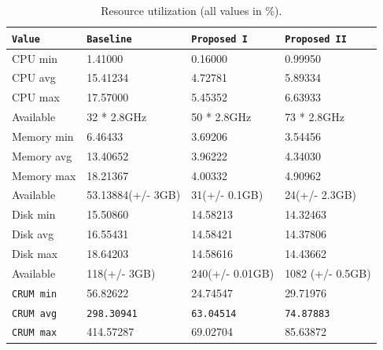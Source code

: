 \documentclass{uvamscse}
\begin{document}
\begin{table}[H]
\begin{center}
\begin{tabular}{llll}
  \texttt{Value}          & \texttt{Baseline}   & \texttt{Proposed I}  & \texttt{Proposed II} \\
  \hline
  CPU min                 & 1.41000             & 0.16000              & 0.99950              \\
  CPU avg                 & 15.41234            & 4.72781              & 5.89334              \\
  CPU max                 & 17.57000            & 5.45352              & 6.63933              \\
  Available               & 32 * 2.8GHz         & 50 * 2.8GHz          & 73 * 2.8GHz          \\
  \hline
  Memory min              & 6.46433             & 3.69206              & 3.54456              \\
  Memory avg              & 13.40652            & 3.96222              & 4.34030              \\
  Memory max              & 18.21367            & 4.00332              & 4.90962              \\
  Available               & 53.13884(+/- 3GB)   & 31(+/- 0.1GB)        & 24(+/- 2.3GB)        \\
  \hline
  Disk min                & 15.50860            & 14.58213             & 14.32463             \\
  Disk avg                & 16.55431            & 14.58421             & 14.37806             \\
  Disk max                & 18.64203            & 14.58616             & 14.43662             \\
  Available               & 118(+/- 3GB)        & 240(+/- 0.01GB)      & 1082 (+/- 0.5GB)     \\
  \hline
  \texttt{CRUM min}       & 56.82622            & 24.74547             & 29.71976             \\
  \texttt{CRUM avg}       & \texttt{298.30941}  & \texttt{63.04514}    & \texttt{74.87883}    \\
  \texttt{CRUM max}       & 414.57287           & 69.02704             & 85.63872             \\
\end{tabular}
\end{center}
\caption{Resource utilization (all values in \%).}
\label{table:crum}
\end{table}
\end{document}
